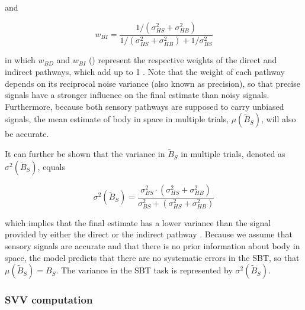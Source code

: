 and

\begin{equation}
\label{p1:eqn4}
w_{BI} = \frac{1/(\sigma^2_{HS} + \sigma^2_{HB})}{1/(\sigma^2_{HS} + \sigma^2_{HB}) + 1/\sigma^2_{BS}}
\end{equation}

in which $w_{BD}$ and $w_{BI}$ () represent the respective weights of the direct and indirect pathways, which add up to 1 \cite{landy1995,jacobs1999,ernst2002,bays2007}. Note that the weight of each pathway depends on its reciprocal noise variance (also known as precision), so that precise signals have a stronger influence on the final estimate than noisy signals. Furthermore, because both sensory pathways are supposed to carry unbiased signals, the mean estimate of body in space in multiple trials, $\mu(\tilde{B}_S)$, will also be accurate.

It can further be shown that the variance in $\tilde{B}_S$ in multiple trials, denoted as $\sigma^2(\tilde{B}_S)$, equals

\begin{equation}
\label{p1:eqn5}
\sigma^2(\tilde{B}_S) = \frac{
\sigma^2_{BS} \cdot (\sigma^2_{HS} + \sigma^2_{HB})
}{
\sigma^2_{BS} + (\sigma^2_{HS} + \sigma^2_{HB})
}
\end{equation}

which implies that the final estimate has a lower variance than the signal provided by either the direct or the indirect pathway \cite{ernst2002,ernst2004}. Because we assume that sensory signals are accurate and that there is no prior information about body in space, the model predicts that there are no systematic errors in the SBT, so that $\mu(\tilde{B}_S) = B_S$. The variance in the SBT task is represented by $\sigma^2(\tilde{B}_S)$.

\subsubsection{SVV computation}

